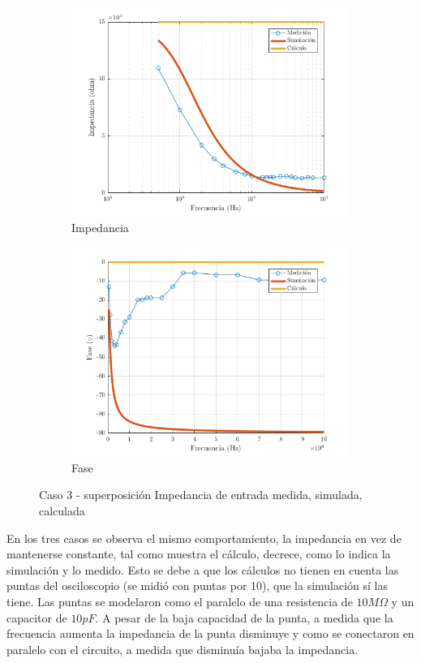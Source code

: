 \documentclass[../../main.tex]{subfiles}
\begin{document}
\begin{figure}[H]
\centering
\begin{subfigure}[http]{0.49\textwidth}
\includegraphics[width=\textwidth]{imagenes/z_n_r_c3.png}
\caption{Impedancia}\label{fig=znZc3}
\end{subfigure}
\begin{subfigure}[http]{0.49\textwidth}
\includegraphics[width=\textwidth]{imagenes/z_n_f_c3.png}
\caption{Fase} \label{fig=znFc3}
\end{subfigure}
\caption{Caso 3 - superposición Impedancia de entrada  medida, simulada, calculada}
\end{figure}

En los tres casos se observa el mismo comportamiento, la impedancia en vez de mantenerse constante, tal como muestra el cálculo, decrece, como lo indica la simulación y lo medido. Esto se debe a que los cálculos no tienen en cuenta las puntas del osciloscopio (se midió con puntas por 10), que la simulación s\'i las tiene. Las puntas se modelaron como el paralelo de una resistencia de $10M\Omega$ y un capacitor de $10pF$. A pesar de la baja capacidad de la punta, a medida que la frecuencia aumenta la impedancia de la punta disminuye y como se conectaron en paralelo con el circuito, a medida que disminuía bajaba la impedancia.
\end{document}
